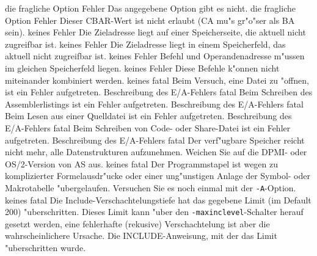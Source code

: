 \documentclass[12pt,a4paper,twoside]{report}
\newcommand{\tty}[1]{{\tt #1}}
\begin{document}
\begin{description}
               {die fragliche Option}
               {Fehler}
               {Das angegebene Option gibt es nicht.}
               {die fragliche Option}
               {Fehler}
               {Dieser CBAR-Wert ist nicht erlaubt (CA mu"s gr"o"ser als BA sein).}
               {keines}
               {Fehler}
               {Die Zieladresse liegt auf einer Speicherseite, die aktuell nicht
                zugreifbar ist.}
               {keines}
               {Fehler}
               {Die Zieladresse liegt in einem Speicherfeld, das aktuell nicht
                zugreifbar ist.}
               {keines}
               {Fehler}
               {Befehl und Operandenadresse m"ussen
                im gleichen Speicherfeld liegen.}
               {keines}
               {Fehler}
               {Diese Befehle k"onnen nicht miteinander kombiniert werden.}
               {keines}
               {fatal}
               {Beim Versuch, eine Datei zu "offnen, ist ein
                Fehler aufgetreten.}
               {Beschreibung des E/A-Fehlers}
               {fatal}
               {Beim Schreiben des Assemblerlistings ist ein
                Fehler aufgetreten.}
               {Beschreibung des E/A-Fehlers}
               {fatal}
               {Beim Lesen aus einer Quelldatei ist ein
                Fehler aufgetreten.}
               {Beschreibung des E/A-Fehlers}
               {fatal}
               {Beim Schreiben von Code- oder Share-Datei
                ist ein Fehler aufgetreten.}
               {Beschreibung des E/A-Fehlers}
               {fatal}
               {Der verf"ugbare Speicher reicht nicht mehr,
	        alle Datenstrukturen aufzunehmen.  Weichen Sie auf die
	        DPMI- oder OS/2-Version von AS aus.}
               {keines}
               {fatal}
               {Der Programmstapel ist wegen zu komplizierter
	        Formelausdr"ucke oder einer ung"unstigen Anlage der Symbol-
	        oder Makrotabelle "ubergelaufen.  Versuchen Sie es noch
	        einmal mit der \tty{-A}-Option.}
               {keines}
               {fatal}
               {Die Include-Verschachtelungstiefe hat das gegebene Limit
                (im Default 200) "uberschritten.  Dieses Limit kann "uber
                den {\tt -maxinclevel}-Schalter herauf gesetzt werden, eine
                fehlerhafte (rekusive) Verschachtelung ist aber die
                wahrscheinlichere Ursache.}
               {Die INCLUDE-Anweisung, mit der das Limit "uberschritten wurde.}
\end{description}
\end{document}
